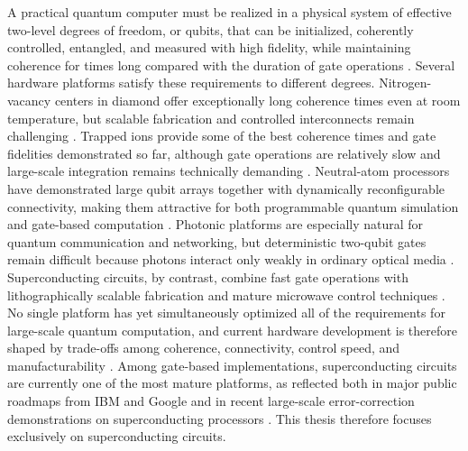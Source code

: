 A practical quantum computer must be realized in a physical system of effective two-level degrees of freedom, or qubits, that can be initialized, coherently controlled, entangled, and measured with high fidelity, while maintaining coherence for times long compared with the duration of gate operations \cite{DiVincenzo2000,Ladd2010}. Several hardware platforms satisfy these requirements to different degrees. Nitrogen-vacancy centers in diamond offer exceptionally long coherence times even at room temperature, but scalable fabrication and controlled interconnects remain challenging \cite{Doherty2013,Pezzagna2021}. Trapped ions provide some of the best coherence times and gate fidelities demonstrated so far, although gate operations are relatively slow and large-scale integration remains technically demanding \cite{Monroe2013,Bruzewicz2019}. Neutral-atom processors have demonstrated large qubit arrays together with dynamically reconfigurable connectivity, making them attractive for both programmable quantum simulation and gate-based computation \cite{Saffman2016,Bluvstein2022}. Photonic platforms are especially natural for quantum communication and networking, but deterministic two-qubit gates remain difficult because photons interact only weakly in ordinary optical media \cite{Kok2007,Slussarenko2019}. Superconducting circuits, by contrast, combine fast gate operations with lithographically scalable fabrication and mature microwave control techniques \cite{Krantz2019,Kjaergaard2020}. No single platform has yet simultaneously optimized all of the requirements for large-scale quantum computation, and current hardware development is therefore shaped by trade-offs among coherence, connectivity, control speed, and manufacturability \cite{DiVincenzo2000,Ladd2010}. Among gate-based implementations, superconducting circuits are currently one of the most mature platforms, as reflected both in major public roadmaps from IBM and Google and in recent large-scale error-correction demonstrations on superconducting processors \cite{IBMRoadmap2025,GoogleRoadmap2026,GoogleQEC2025,Kjaergaard2020}. This thesis therefore focuses exclusively on superconducting circuits.

